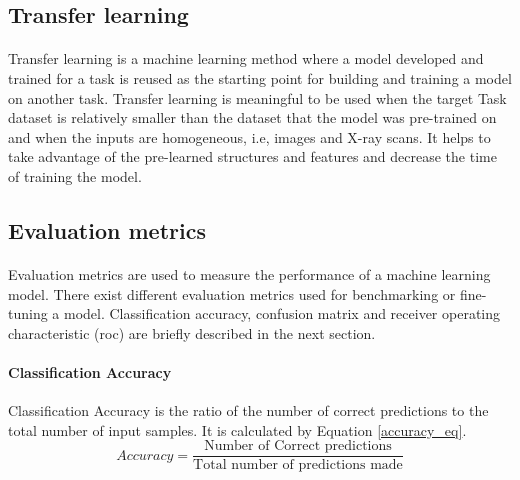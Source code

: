 \subsection{Transfer learning}
\paragraph{}
Transfer learning is a machine learning method where a model developed and trained for a task is reused as the starting point for building and training a model on another task. Transfer learning is meaningful to be used when the target Task dataset is relatively smaller than the dataset that the model was pre-trained on and when the inputs are homogeneous, i.e, images and X-ray scans. It helps to take advantage of the pre-learned structures and features and decrease the time of training the model.
\subsection{Evaluation metrics}
\paragraph{}
Evaluation metrics are used to measure the performance of a machine learning model. There exist different evaluation metrics used for benchmarking or fine-tuning a model. Classification accuracy, confusion matrix and receiver operating characteristic (\acs{roc}) are briefly described in the next section.
\paragraph{Classification Accuracy}
Classification Accuracy is the ratio of the number of correct predictions to the total number of input samples. It is calculated by Equation \ref{accuracy_eq}.
\begin{equation}
Accuracy =\frac{\textrm{Number of Correct predictions}}{\textrm{Total number of predictions made}}
\label{accuracy_eq}
\end{equation}
